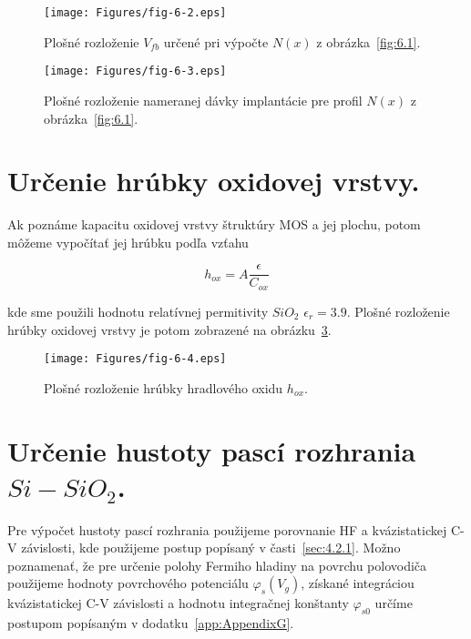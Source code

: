 \begin{figure}[h!]\centering
  \texttt{[image: Figures/fig-6-2.eps]}
  \caption[Plošné rozloženie $V_{fb}$]{Plošné rozloženie $V_{fb}$
    určené pri výpočte $N(x)$ z obrázka~\ref{fig:6.1}.}\label{fig:6.2}
\end{figure}

\begin{figure}[h!]\centering
  \texttt{[image: Figures/fig-6-3.eps]}
  \caption[Plošné rozloženie nameranej dávky implantácie]{Plošné
    rozloženie nameranej dávky implantácie pre profil $N(x)$ z
    obrázka~\ref{fig:6.1}.}\label{fig:6.3}
\end{figure}

\section{Určenie hrúbky oxidovej vrstvy.}\label{sec:6.2}

Ak poznáme kapacitu oxidovej vrstvy štruktúry MOS a jej plochu, potom
môžeme vypočítať jej hrúbku podľa vzťahu

\begin{equation}\label{eq:6.3}
  h_{ox} = A \frac{\epsilon}{C_{ox}}
\end{equation}

kde sme použili hodnotu relatívnej permitivity $SiO_{2}$
$\epsilon_{r}=3.9$. Plošné rozloženie hrúbky oxidovej vrstvy je potom
zobrazené na obrázku~\ref{fig:6.4}.

\begin{figure}[h!]\centering
  \texttt{[image: Figures/fig-6-4.eps]}
  \caption[Plošné rozloženie hrúbky hradlového oxidu $h_{ox}$]{Plošné
    rozloženie hrúbky hradlového oxidu $h_{ox}$.}\label{fig:6.4}
\end{figure}

\section{Určenie hustoty pascí rozhrania $Si-SiO_{2}$.}\label{sec:6.3}

Pre výpočet hustoty pascí rozhrania použijeme porovnanie HF a
kvázistatickej C-V závislosti, kde použijeme postup popísaný v
časti~\ref{sec:4.2.1}. Možno poznamenať, že pre určenie polohy Fermiho
hladiny na povrchu polovodiča použijeme hodnoty povrchového potenciálu
$\varphi_{s}(V_{g})$, získané integráciou kvázistatickej C-V
závislosti a hodnotu integračnej konštanty $\varphi_{s0}$ určíme
postupom popísaným v dodatku~\ref{app:AppendixG}.

